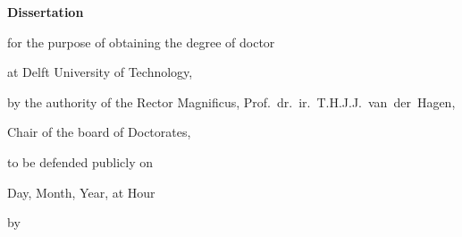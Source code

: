 \begin{titlepage}

\begin{center}

\vspace*{2\bigskipamount}

{\makeatletter
\titlestyle\bfseries\LARGE\@title
\makeatother}

{\makeatletter
\ifx\@subtitle\undefined\else
    \bigskip
    \titlefont\titleshape\Large\@subtitle
\fi
\makeatother}

\end{center}

\cleardoublepage
\thispagestyle{empty}

\begin{center}


\vspace*{2\bigskipamount}

{\makeatletter
\titlestyle\bfseries\LARGE\@title
\makeatother}

{\makeatletter
\ifx\@subtitle\undefined\else
    \bigskip
    \titlefont\titleshape\Large\@subtitle
\fi
\makeatother}

\vfill


{\Large\titlefont\bfseries Dissertation}

\bigskip
\bigskip

for the purpose of obtaining the degree of doctor

at Delft University of Technology,

by the authority of the Rector Magnificus, Prof.~dr.~ir.~T.H.J.J.~van~der~Hagen,

Chair of the board of Doctorates,

to be defended publicly on

Day, Month, Year, at Hour

\bigskip
\bigskip

by

\bigskip
\bigskip


\end{center}
\end{titlepage}
